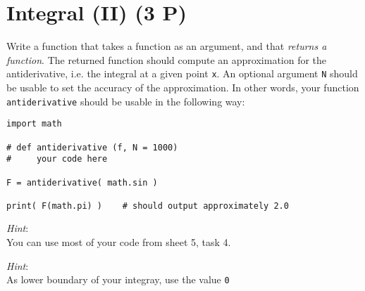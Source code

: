 \documentclass[
	english,
	fontsize=10pt,
	parskip=half,
	titlepage=true,
	DIV=12
]{scrartcl}
\newcommand*{\inPy}[1]{\texttt{#1}}
\newcommand*{\ie}{i.\;e. }
\begin{document}
\section{Integral (II) (3 P)}
Write a function that takes a function as an argument, and that \emph{returns a function}. The returned function should compute an approximation for the antiderivative, \ie the integral at a given point \texttt{x}. An optional argument \texttt{N} should be usable to set the accuracy of the approximation.
In other words, your function \texttt{antiderivative} should be usable in the following way:

\begin{verbatim}
import math

# def antiderivative (f, N = 1000)
#     your code here

F = antiderivative( math.sin )

print( F(math.pi) )    # should output approximately 2.0
\end{verbatim}

\emph{Hint}:\\
You can use most of your code from sheet 5, task 4.

\emph{Hint}:\\
As lower boundary of your integray, use the value \inPy{0}
\end{document}
